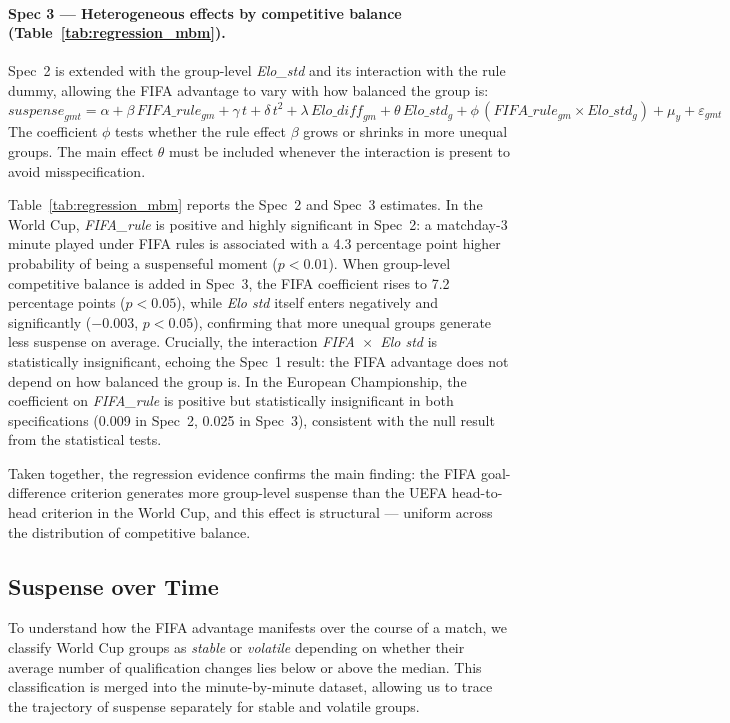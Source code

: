 \documentclass[11pt]{article}
\begin{document}
\paragraph{Spec 3 — Heterogeneous effects by competitive balance (Table~\ref{tab:regression_mbm}).}
Spec~2 is extended with the group-level \textit{Elo\_std} and its interaction with the rule dummy, allowing the FIFA advantage to vary with how balanced the group is:
\[
\textit{suspense}_{gmt}
  = \alpha + \beta\,\textit{FIFA\_rule}_{gm}
  + \gamma\,t + \delta\,t^2
  + \lambda\,\textit{Elo\_diff}_{gm}
  + \theta\,\textit{Elo\_std}_g
  + \phi\,(\textit{FIFA\_rule}_{gm} \times \textit{Elo\_std}_g)
  + \mu_y + \varepsilon_{gmt}
\]
The coefficient $\phi$ tests whether the rule effect $\beta$ grows or shrinks in more unequal groups. The main effect $\theta$ must be included whenever the interaction is present to avoid misspecification.



Table~\ref{tab:regression_mbm} reports the Spec~2 and Spec~3 estimates. In the World Cup, \textit{FIFA\_rule} is positive and highly significant in Spec~2: a matchday-3 minute played under FIFA rules is associated with a 4.3 percentage point higher probability of being a suspenseful moment ($p<0.01$). When group-level competitive balance is added in Spec~3, the FIFA coefficient rises to 7.2 percentage points ($p<0.05$), while \textit{Elo std} itself enters negatively and significantly ($-0.003$, $p<0.05$), confirming that more unequal groups generate less suspense on average. Crucially, the interaction \textit{FIFA~$\times$~Elo std} is statistically insignificant, echoing the Spec~1 result: the FIFA advantage does not depend on how balanced the group is. In the European Championship, the coefficient on \textit{FIFA\_rule} is positive but statistically insignificant in both specifications (0.009 in Spec~2, 0.025 in Spec~3), consistent with the null result from the statistical tests.

Taken together, the regression evidence confirms the main finding: the FIFA goal-difference criterion generates more group-level suspense than the UEFA head-to-head criterion in the World Cup, and this effect is structural — uniform across the distribution of competitive balance.


\subsection{Suspense over Time}

To understand how the FIFA advantage manifests over the course of a match, we classify World Cup groups as \textit{stable} or \textit{volatile} depending on whether their average number of qualification changes lies below or above the median. This classification is merged into the minute-by-minute dataset, allowing us to trace the trajectory of suspense separately for stable and volatile groups.
\end{document}
